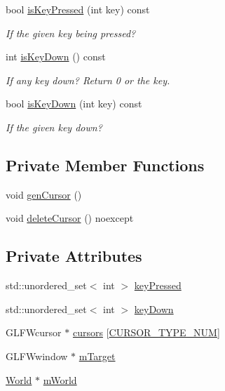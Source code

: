 \begin{DoxyCompactItemize}
bool \hyperlink{classWindow_a70650bc742d83d02d88ea8e4d439c604}{is\+Key\+Pressed} (int key) const 
\begin{DoxyCompactList}\small\item\em If the given key being pressed? \end{DoxyCompactList}\item 
int \hyperlink{classWindow_ad58881f941c43e6dc19761cae3ab8f39}{is\+Key\+Down} () const 
\begin{DoxyCompactList}\small\item\em If any key down? Return 0 or the key. \end{DoxyCompactList}\item 
bool \hyperlink{classWindow_a6a9f53b08efd0a9caae810ea8ae687ac}{is\+Key\+Down} (int key) const 
\begin{DoxyCompactList}\small\item\em If the given key down? \end{DoxyCompactList}\end{DoxyCompactItemize}
\subsection*{Private Member Functions}
\begin{DoxyCompactItemize}
\item 
void \hyperlink{classWindow_ae641de92062a8cccfeb70865f43eb3cc}{gen\+Cursor} ()
\item 
void \hyperlink{classWindow_a94766ef922dabc090209c900d8919261}{delete\+Cursor} () noexcept
\end{DoxyCompactItemize}
\subsection*{Private Attributes}
\begin{DoxyCompactItemize}
\item 
std\+::unordered\+\_\+set$<$ int $>$ \hyperlink{classWindow_a9d50c88c4f961f1a04df6277ac5d7e04}{key\+Pressed}
\item 
std\+::unordered\+\_\+set$<$ int $>$ \hyperlink{classWindow_a94a88a2fcc3cb7a2bf185a826fdc4f4a}{key\+Down}
\item 
G\+L\+F\+Wcursor $\ast$ \hyperlink{classWindow_a3dd8cb54d02c66ad36af75d46c96494e}{cursors} \mbox{[}\hyperlink{classWindow_a777c693a4c2b74e712839aa15189e07fad4d3e8c6d4b72f1b918b63b0f18888d3}{C\+U\+R\+S\+O\+R\+\_\+\+T\+Y\+P\+E\+\_\+\+N\+U\+M}\mbox{]}
\item 
G\+L\+F\+Wwindow $\ast$ \hyperlink{classWindow_a7a550555d11ea29c11c676dacd461a9d}{m\+Target}
\item 
\hyperlink{classWorld}{World} $\ast$ \hyperlink{classWindow_afb9b02f2043b74bd89ac7d1f59c269b4}{m\+World}
\end{DoxyCompactItemize}
